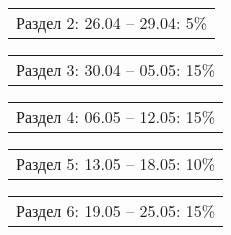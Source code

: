 \documentclass[12pt, А4, twoside]{article}
\begin{document}
\begin{FlushLeft}
    \vspace{-0.1 cm}

    \begin{tabular}{p{17.25cm}}
        \hspace{0.3cm} \textsf{Раздел 2:} \hspace{2.54cm} \textsf{ 26.04 {--} 29.04:} \hspace{0.5cm} \textsf{5\%} \vspace{0pt} \hline \\
    \end{tabular}

    \vspace{-0.1 cm}

    \begin{tabular}{p{17.25cm}}
        \hspace{0.3cm} \textsf{Раздел 3:} \hspace{2.54cm} \textsf{ 30.04 {--} 05.05:} \hspace{0.5cm} \textsf{15\%} \vspace{0pt} \hline \\
    \end{tabular}

    \vspace{-0.1 cm}

    \begin{tabular}{p{17.25cm}}
        \hspace{0.3cm} \textsf{Раздел 4:} \hspace{2.54cm} \textsf{ 06.05 {--} 12.05:} \hspace{0.5cm} \textsf{15\%} \vspace{0pt} \hline \\
    \end{tabular}

    \vspace{-0.1 cm}

    \begin{tabular}{p{17.25cm}}
        \hspace{0.3cm} \textsf{Раздел 5:} \hspace{2.54cm} \textsf{ 13.05 {--} 18.05:} \hspace{0.5cm} \textsf{10\%} \vspace{0pt} \hline \\
    \end{tabular}

    \vspace{-0.1 cm}

    \begin{tabular}{p{17.25cm}}
        \hspace{0.3cm} \textsf{Раздел 6:} \hspace{2.54cm} \textsf{ 19.05 {--} 25.05:} \hspace{0.5cm} \textsf{15\%} \vspace{0pt} \hline \\
    \end{tabular}


\end{FlushLeft}
\end{document}
